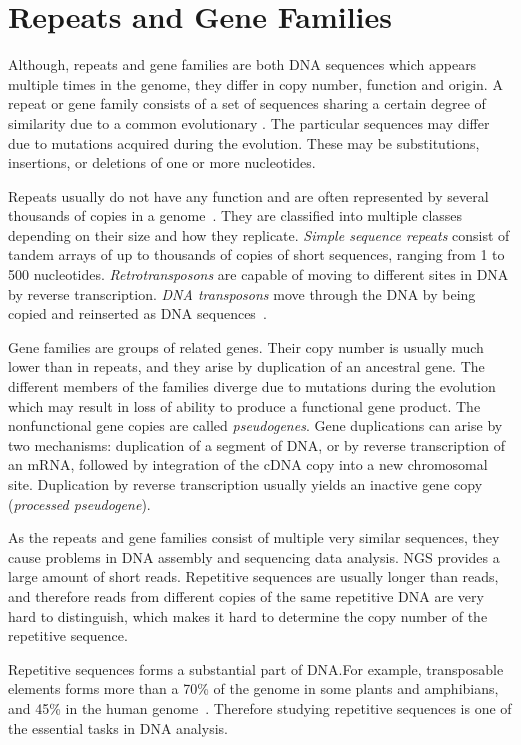 \chapter[Rep.\ and Gene Fam.]{Repeats and Gene Families}\label{chap:repeatsfamilies}

Although, repeats and gene families are both DNA sequences which appears multiple times in the genome, they differ in copy number, function and origin.
A repeat or gene family consists of a set of sequences sharing a certain degree of similarity due to a common evolutionary . The particular sequences may differ due to mutations acquired during the evolution. These may be substitutions, insertions, or deletions of one or more nucleotides.

Repeats usually do not have any function and are often represented by several thousands of copies in a genome~\cite{cell}. They are classified into multiple classes depending on their size and how they replicate.
\emph{Simple sequence repeats} consist of tandem arrays of up to thousands of copies of short sequences, ranging from 1 to 500 nucleotides.
\emph{Retrotransposons} are capable of moving to different sites in DNA by reverse transcription.
\emph{DNA transposons} move through the DNA by being copied and reinserted as DNA sequences~\cite{cell}.

Gene families are groups of related genes.
Their copy number is usually much lower than in repeats, and they arise by duplication of an ancestral gene. The different members of the families diverge due to mutations during the evolution which may result in loss of ability to produce a functional gene product. The nonfunctional gene copies are called \emph{pseudogenes}.
Gene duplications can arise by two mechanisms: duplication of a segment of DNA, or by reverse transcription of an mRNA, followed by integration of the cDNA copy into a new chromosomal site.
Duplication by reverse transcription usually yields an inactive gene copy (\emph{processed pseudogene}).

As the repeats and gene families consist of multiple very similar sequences, they cause problems in DNA assembly and sequencing data analysis. NGS provides a large amount of short reads. Repetitive sequences are usually longer than reads, and therefore reads from different copies of the same repetitive DNA are very hard to distinguish, which makes it hard to determine the copy number of the repetitive sequence.

Repetitive sequences forms a substantial part of DNA.\@ For example,
transposable elements forms more than a 70\% of the genome in some plants and amphibians, and 45\% in the human genome~\cite{biemont2006genetics}.
Therefore studying repetitive sequences is one of the essential tasks in DNA analysis.

